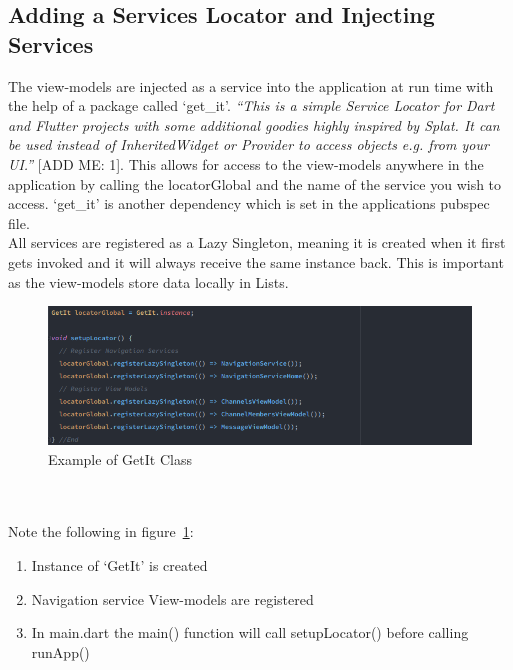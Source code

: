 \subsection{Adding a Services Locator and Injecting Services}
The view-models are injected as a service into the application at run time with the help of a package called ‘get\_it’. \textit{“This is a simple Service Locator for Dart and Flutter projects with some additional goodies highly inspired by Splat. It can be used instead of InheritedWidget or Provider to access objects e.g. from your UI.”} [ADD ME: 1]. This allows for access to the view-models anywhere in the application by calling the locatorGlobal and the name of the service you wish to access. ‘get\_it’ is another dependency which is set in the applications pubspec file. 
\\ All services are registered as a Lazy Singleton, meaning it is created when it first gets invoked and it will always receive the same instance back. This is important as the view-models store data locally in Lists.
\begin{figure}[h!]
    \caption{Example of GetIt Class}
    \label{image:getItClass}
    \centering
    \includegraphics[width=1.0\textwidth]{images/get_it_class.png}
\end{figure}
\\\\Note the following in figure~\ref{image:getItClass}:
\begin{enumerate}
	\item Instance of ‘GetIt’ is created
	\item Navigation service View-models are registered
	\item In main.dart the main() function will call setupLocator() before calling runApp()
\end{enumerate}

